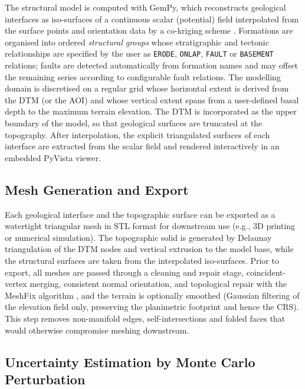 \documentclass[11pt,a4paper]{article}
\begin{document}
The structural model is computed with GemPy, which reconstructs
geological interfaces as iso-surfaces of a continuous scalar (potential)
field interpolated from the surface points and orientation data by a
co-kriging scheme \cite{Gempy_2021}. Formations are organised into ordered
\emph{structural groups} whose stratigraphic and tectonic relationships
are specified by the user as \texttt{ERODE}, \texttt{ONLAP},
\texttt{FAULT} or \texttt{BASEMENT} relations; faults are detected
automatically from formation names and may offset the remaining series
according to configurable fault relations. The modelling domain is
discretised on a regular grid whose horizontal extent is derived from the
DTM (or the AOI) and whose vertical extent spans from a user-defined basal
depth to the maximum terrain elevation. The DTM is incorporated as the
upper boundary of the model, so that geological surfaces are truncated at
the topography. After interpolation, the explicit triangulated surfaces of
each interface are extracted from the scalar field and rendered
interactively in an embedded PyVista \cite{Sullivan2019} viewer.

\subsection{Mesh Generation and Export}

Each geological interface and the topographic surface can be exported as a
watertight triangular mesh in STL format for downstream use (e.g., 3D
printing or numerical simulation). The topographic solid is generated by
Delaunay triangulation of the DTM nodes and vertical extrusion to the
model base, while the structural surfaces are taken from the interpolated
iso-surfaces. Prior to export, all meshes are passed through a cleaning
and repair stage, coincident-vertex merging, consistent normal
orientation, and topological repair with the MeshFix
algorithm \cite{Attene2010MeshFix}, and the terrain is optionally smoothed
(Gaussian filtering of the elevation field only, preserving the
planimetric footprint and hence the CRS). This step removes non-manifold
edges, self-intersections and folded faces that would otherwise compromise
meshing downstream.

\subsection{Uncertainty Estimation by Monte Carlo Perturbation}
\end{document}

